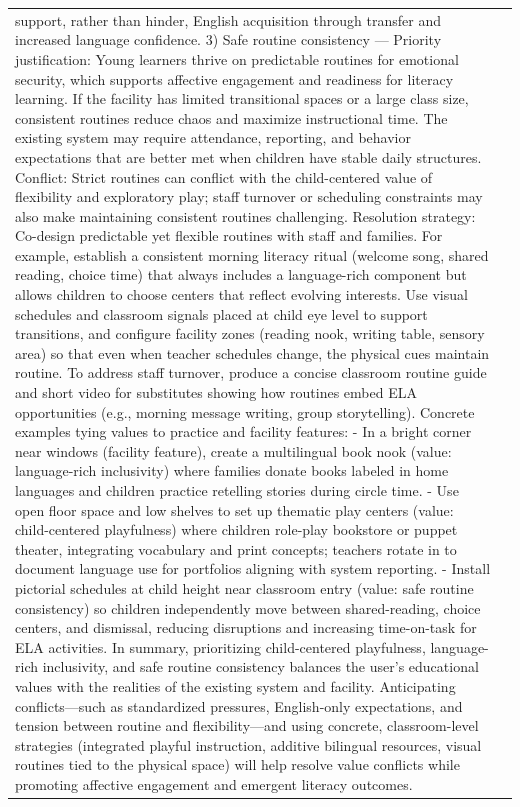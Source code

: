 \begin{longtable}{@{}l p{13cm}@{}}
support, rather than hinder, English acquisition through transfer and increased language confidence. 3) Safe routine consistency --- Priority justification: Young learners thrive on predictable routines for emotional security, which supports affective engagement and readiness for literacy learning. If the facility has limited transitional spaces or a large class size, consistent routines reduce chaos and maximize instructional time. The existing system may require attendance, reporting, and behavior expectations that are better met when children have stable daily structures. Conflict: Strict routines can conflict with the child-centered value of flexibility and exploratory play; staff turnover or scheduling constraints may also make maintaining consistent routines challenging. Resolution strategy: Co-design predictable yet flexible routines with staff and families. For example, establish a consistent morning literacy ritual (welcome song, shared reading, choice time) that always includes a language-rich component but allows children to choose centers that reflect evolving interests. Use visual schedules and classroom signals placed at child eye level to support transitions, and configure facility zones (reading nook, writing table, sensory area) so that even when teacher schedules change, the physical cues maintain routine. To address staff turnover, produce a concise classroom routine guide and short video for substitutes showing how routines embed ELA opportunities (e.g., morning message writing, group storytelling). Concrete examples tying values to practice and facility features: - In a bright corner near windows (facility feature), create a multilingual book nook (value: language-rich inclusivity) where families donate books labeled in home languages and children practice retelling stories during circle time. - Use open floor space and low shelves to set up thematic play centers (value: child-centered playfulness) where children role-play bookstore or puppet theater, integrating vocabulary and print concepts; teachers rotate in to document language use for portfolios aligning with system reporting. - Install pictorial schedules at child height near classroom entry (value: safe routine consistency) so children independently move between shared-reading, choice centers, and dismissal, reducing disruptions and increasing time-on-task for ELA activities. In summary, prioritizing child-centered playfulness, language-rich inclusivity, and safe routine consistency balances the user's educational values with the realities of the existing system and facility. Anticipating conflicts---such as standardized pressures, English-only expectations, and tension between routine and flexibility---and using concrete, classroom-level strategies (integrated playful instruction, additive bilingual resources, visual routines tied to the physical space) will help resolve value conflicts while promoting affective engagement and emergent literacy outcomes.      \\

\end{longtable}
